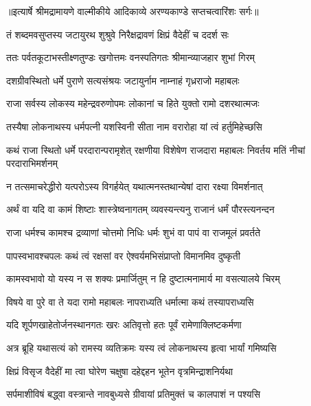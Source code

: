 {॥इत्यार्षे श्रीमद्रामायणे वाल्मीकीये आदिकाव्ये अरण्यकाण्डे सप्तचत्वारिंशः सर्गः॥}


\twolineshloka
{तं शब्दमवसुप्तस्य जटायुरथ शुश्रुवे}
{निरैक्षद्रावणं क्षिप्रं वैदेहीं च ददर्श सः} %

\twolineshloka
{ततः पर्वतकूटाभस्तीक्ष्णतुण्डः खगोत्तमः}
{वनस्पतिगतः श्रीमान्व्याजहार शुभां गिरम्} %

\twolineshloka
{दशग्रीवस्थितो धर्मे पुराणे सत्यसंश्रयः}
{जटायुर्नाम नाम्नाहं गृध्रराजो महाबलः} %

\twolineshloka
{राजा सर्वस्य लोकस्य महेन्द्रवरुणोपमः}
{लोकानां च हिते युक्तो रामो दशरथात्मजः} %

\twolineshloka
{तस्यैषा लोकनाथस्य धर्मपत्नी यशस्विनी}
{सीता नाम वरारोहा यां त्वं हर्तुमिहेच्छसि} %

\threelineshloka
{कथं राजा स्थितो धर्मे परदारान्परामृशेत्}
{रक्षणीया विशेषेण राजदारा महाबलः}
{निवर्तय मतिं नीचां परदाराभिमर्शनम्} %

\twolineshloka
{न तत्समाचरेद्धीरो यत्परोऽस्य विगर्हयेत्}
{यथात्मनस्तथान्येषां दारा रक्ष्या विमर्शनात्} %

\twolineshloka
{अर्थं वा यदि वा कामं शिष्टाः शास्त्रेष्वनागतम्}
{व्यवस्यन्त्यनु राजानं धर्मं पौरस्त्यनन्दन} %

\twolineshloka
{राजा धर्मश्च कामश्च द्रव्याणां चोत्तमो निधिः}
{धर्मः शुभं वा पापं वा राजमूलं प्रवर्तते} %

\twolineshloka
{पापस्वभावश्चपलः कथं त्वं रक्षसां वर}
{ऐश्वर्यमभिसंप्राप्तो विमानमिव दुष्कृती} %

\twolineshloka
{कामस्वभावो यो यस्य न स शक्यः प्रमार्जितुम्}
{न हि दुष्टात्मनामार्य मा वसत्यालये चिरम्} %

\twolineshloka
{विषये वा पुरे वा ते यदा रामो महाबलः}
{नापराध्यति धर्मात्मा कथं तस्यापराध्यसि} %

\twolineshloka
{यदि शूर्पणखाहेतोर्जनस्थानगतः खरः}
{अतिवृत्तो हतः पूर्वं रामेणाक्लिष्टकर्मणा} %

\twolineshloka
{अत्र ब्रूहि यथासत्यं को रामस्य व्यतिक्रमः}
{यस्य त्वं लोकनाथस्य हृत्वा भार्यां गमिष्यसि} %

\twolineshloka
{क्षिप्रं विसृज वैदेहीं मा त्वा घोरेण चक्षुषा}
{दहेद्दहन भूतेन वृत्रमिन्द्राशनिर्यथा} %

\twolineshloka
{सर्पमाशीविषं बद्ध्वा वस्त्रान्ते नावबुध्यसे}
{ग्रीवायां प्रतिमुक्तं च कालपाशं न पश्यसि} %

